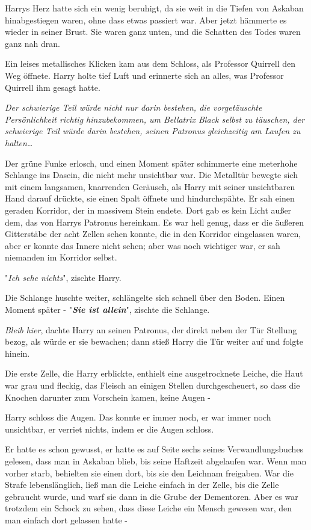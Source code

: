 {Harrys Herz hatte sich ein wenig beruhigt, da sie weit in die Tiefen von Askaban hinabgestiegen waren, ohne dass etwas passiert war. Aber jetzt hämmerte es wieder in seiner Brust. Sie waren ganz unten, und die Schatten des Todes waren ganz nah dran.

Ein leises metallisches Klicken kam aus dem Schloss, als Professor Quirrell den Weg öffnete. Harry holte tief Luft und erinnerte sich an alles, was Professor Quirrell ihm gesagt hatte.

\emph{Der schwierige Teil würde nicht nur darin bestehen, die vorgetäuschte Persönlichkeit richtig hinzubekommen, um Bellatrix Black selbst zu täuschen, der schwierige Teil würde darin bestehen, seinen Patronus gleichzeitig am Laufen zu halten…}

Der grüne Funke erlosch, und einen Moment später schimmerte eine meterhohe Schlange ins Dasein, die nicht mehr unsichtbar war. Die Metalltür bewegte sich mit einem langsamen, knarrenden Geräusch, als Harry mit seiner unsichtbaren Hand darauf drückte, sie einen Spalt öffnete und hindurchspähte. Er sah einen geraden Korridor, der in massivem Stein endete. Dort gab es kein Licht außer dem, das von Harrys Patronus hereinkam. Es war hell genug, dass er die äußeren Gitterstäbe der acht Zellen sehen konnte, die in den Korridor eingelassen waren, aber er konnte das Innere nicht sehen; aber was noch wichtiger war, er sah niemanden im Korridor selbst.

"\emph{Ich sehe nichts}", zischte Harry.

Die Schlange huschte weiter, schlängelte sich schnell über den Boden. Einen Moment später - "\textbf{\emph{Sie ist allein}}", zischte die Schlange.

\emph{Bleib hier}, dachte Harry an seinen Patronus, der direkt neben der Tür Stellung bezog, als würde er sie bewachen; dann stieß Harry die Tür weiter auf und folgte hinein.

Die erste Zelle, die Harry erblickte, enthielt eine ausgetrocknete Leiche, die Haut war grau und fleckig, das Fleisch an einigen Stellen durchgescheuert, so dass die Knochen darunter zum Vorschein kamen, keine Augen -

Harry schloss die Augen. Das konnte er immer noch, er war immer noch unsichtbar, er verriet nichts, indem er die Augen schloss.

Er hatte es schon gewusst, er hatte es auf Seite sechs seines Verwandlungsbuches gelesen, dass man in Askaban blieb, bis seine Haftzeit abgelaufen war. Wenn man vorher starb, behielten sie einen dort, bis sie den Leichnam freigaben. War die Strafe lebenslänglich, ließ man die Leiche einfach in der Zelle, bis die Zelle gebraucht wurde, und warf sie dann in die Grube der Dementoren. Aber es war trotzdem ein Schock zu sehen, dass diese Leiche ein Mensch gewesen war, den man einfach dort gelassen hatte -

}
